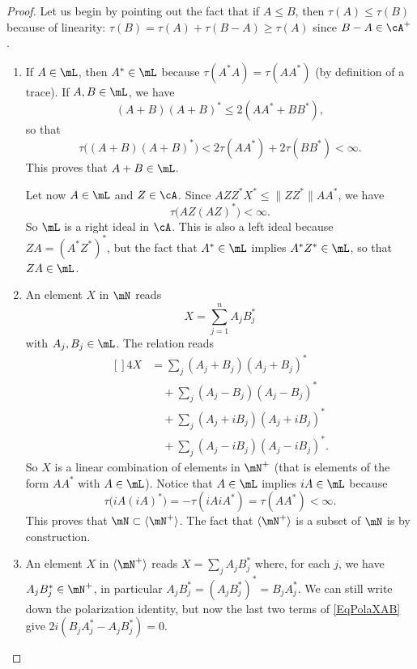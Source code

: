 \begin{proof}
	Let us begin by pointing out the fact that if $A\leq B$, then $\tau(A)\leq\tau(B)$ because of linearity: $\tau(B)=\tau(A)+\tau(B-A)\geq\tau(A)$ since $B-A\in\cA^+$.

	\begin{enumerate}
		\item
		      If $A\in\mL$, then $A^*\in\mL$ because $\tau(A^*A)=\tau(AA^*)$ (by definition of a trace). If $A,B\in\mL$, we have
		      \begin{equation}
			      (A+B)(A+B)^*\leq 2(AA^*+BB^*),
		      \end{equation}
		      so that
		      \begin{equation}
			      \tau\big( (A+B)(A+B)^* \big)<2\tau(AA^*)+2\tau(BB^*)<\infty.
		      \end{equation}
		      This proves that $A+B\in\mL$.

		      Let now $A\in\mL$ and $Z\in\cA$. Since $AZZ^*X^*\leq\| ZZ^* \|AA^*$, we have
		      \begin{equation}
			      \tau\big( AZ(AZ)^* \big)<\infty.
		      \end{equation}
		      So $\mL$ is a right ideal in $\cA$. This is also a left ideal because $ZA=(A^*Z^*)^*$, but the fact that $A^*\in\mL$ implies $A^*Z^*\in\mL$, so that $ZA\in\mL$.
		\item
		      An element $X$ in $\mN$ reads
		      \begin{equation}
			      X=\sum_{j=1}^{n}A_jB_j^*
		      \end{equation}
		      with $A_j,B_j\in\mL$. The  relation reads
		      \begin{equation}        \label{EqPolaXAB}
			      \begin{aligned}[]
				      4X & =\sum_j(A_j+B_j)(A_j+B_j)^*         \\
				         & \quad+\sum_j(A_j-B_j)(A_j-B_j)^*    \\
				         & \quad+\sum_j(A_j+iB_j)(A_j+iB_j)^*  \\
				         & \quad+\sum_j(A_j-iB_j)(A_j-iB_j)^*.
			      \end{aligned}
		      \end{equation}
		      So $X$ is a linear combination of elements in $\mN^+$ (that is elements of the form $AA^*$ with $A\in\mL$). Notice that $A\in\mL$ implies $iA\in\mL$ because
		      \begin{equation}
			      \tau\big( iA(iA)^* \big)=-\tau(iAiA^*)=\tau(AA^*)<\infty.
		      \end{equation}
		      This proves that $\mN\subset\langle \mN^+\rangle$. The fact that $\langle \mN^+\rangle$ is a subset of $\mN$ is by construction.
		\item
		      An element $X$ in $\langle \mN^+\rangle$  reads $X=\sum_jA_jB^*_j$ where, for each $j$, we have $A_jB_j^*\in\mN^+$, in particular $A_jB^*_j=(A_jB^*_j)^*=B_jA_j^*$. We can still write down the polarization identity, but now the last two terms of \eqref{EqPolaXAB} give $2i(B_jA_j^*-A_jB_j^*)=0$.


\end{enumerate}
\end{proof}
